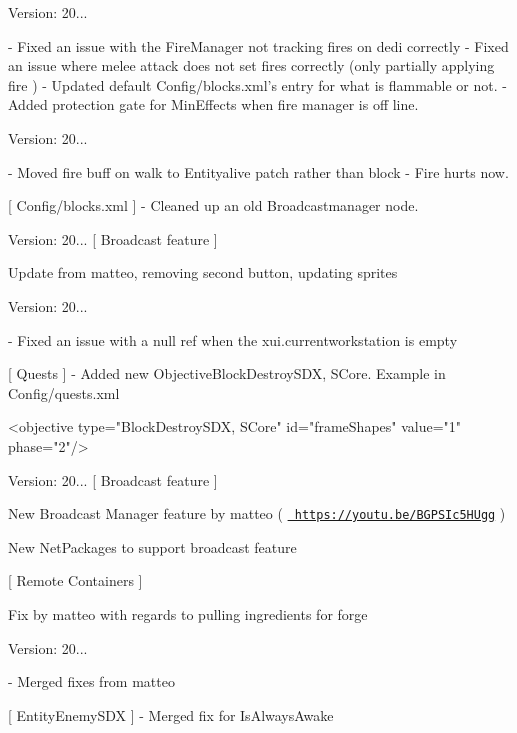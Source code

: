 Version\+: 20... \begin{DoxyVerb}
    - Fixed an issue with the FireManager not tracking fires on dedi correctly
    - Fixed an issue where melee attack does not set fires correctly (only partially applying fire )
    - Updated default Config/blocks.xml's entry for what is flammable or not.
    - Added protection gate for MinEffects when fire manager is off line.
\end{DoxyVerb}


Version\+: 20... \begin{DoxyVerb}
    - Moved fire buff on walk to Entityalive patch rather than block
    - Fire hurts now.

[ Config/blocks.xml ]
    - Cleaned up an old Broadcastmanager node.
\end{DoxyVerb}
 Version\+: 20... \mbox{[} Broadcast feature \mbox{]}
\begin{DoxyItemize}
\item Update from matteo, removing second button, updating sprites
\end{DoxyItemize}

Version\+: 20... \begin{DoxyVerb}
    - Fixed an issue with a null ref when the xui.currentworkstation is empty

[ Quests ]
    - Added new ObjectiveBlockDestroySDX, SCore. Example in Config/quests.xml

        <objective type="BlockDestroySDX, SCore" id="frameShapes" value="1" phase="2"/>
\end{DoxyVerb}


Version\+: 20... \mbox{[} Broadcast feature \mbox{]}
\begin{DoxyItemize}
\item New Broadcast Manager feature by matteo ( \href{https://youtu.be/BGPSIc5HUgg}{\texttt{ https\+://youtu.\+be/\+BGPSIc5\+HUgg}} )
\item New Net\+Packages to support broadcast feature
\end{DoxyItemize}

\mbox{[} Remote Containers \mbox{]}
\begin{DoxyItemize}
\item Fix by matteo with regards to pulling ingredients for forge
\end{DoxyItemize}

Version\+: 20... \begin{DoxyVerb}
    - Merged fixes from matteo

[ EntityEnemySDX ]
    - Merged fix for IsAlwaysAwake
\end{DoxyVerb}


